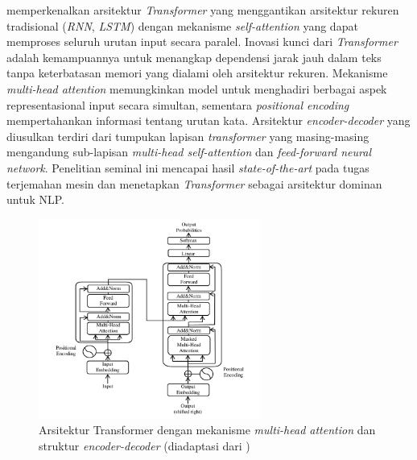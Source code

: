 \textcite{vaswani2017} memperkenalkan arsitektur \textit{Transformer} yang menggantikan arsitektur rekuren tradisional (\textit{RNN}, \textit{LSTM}) dengan mekanisme \textit{self-attention} yang dapat memproses seluruh urutan input secara paralel. Inovasi kunci dari \textit{Transformer} adalah kemampuannya untuk menangkap dependensi jarak jauh dalam teks tanpa keterbatasan memori yang dialami oleh arsitektur rekuren. Mekanisme \textit{multi-head attention} memungkinkan model untuk menghadiri berbagai aspek representasional input secara simultan, sementara \textit{positional encoding} mempertahankan informasi tentang urutan kata. Arsitektur \textit{encoder-decoder} yang diusulkan terdiri dari tumpukan lapisan \textit{transformer} yang masing-masing mengandung sub-lapisan \textit{multi-head self-attention} dan \textit{feed-forward neural network}. Penelitian seminal ini mencapai hasil \textit{state-of-the-art} pada tugas terjemahan mesin dan menetapkan \textit{Transformer} sebagai arsitektur dominan untuk NLP.

\begin{figure}[H]
  \centering
  \includegraphics[width=0.65\textwidth]{image/transformer-architecture.png}
  \caption{Arsitektur Transformer dengan mekanisme \textit{multi-head attention} dan struktur \textit{encoder-decoder} (diadaptasi dari \textcite{vaswani2017})}
  \label{fig:transformer-arch}
\end{figure}

